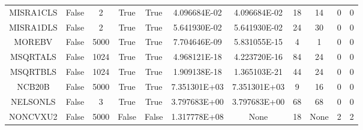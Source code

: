 \begin{longtable}{ccccccccccc}
	\cellcolor{default2} MISRA1CLS& \cellcolor{default2} False& \cellcolor{default2} 2& \cellcolor{default2} True& \cellcolor{default2} True& \cellcolor{best} 4.096684E-02& \cellcolor{ok} 4.096684E-02& \cellcolor{ok} 18& \cellcolor{best} 14& \cellcolor{default2} 0& \cellcolor{default2} 0\\
	\cellcolor{default1} MISRA1DLS& \cellcolor{default1} False& \cellcolor{default1} 2& \cellcolor{default1} True& \cellcolor{default1} True& \cellcolor{best} 5.641930E-02& \cellcolor{ok} 5.641930E-02& \cellcolor{best} 24& \cellcolor{ok} 30& \cellcolor{default1} 0& \cellcolor{default1} 0\\
	\cellcolor{default2} MOREBV& \cellcolor{default2} False& \cellcolor{default2} 5000& \cellcolor{default2} True& \cellcolor{default2} True& \cellcolor{ok} 7.704646E-09& \cellcolor{best} 5.831055E-15& \cellcolor{poor} 4& \cellcolor{best} 1& \cellcolor{default2} 0& \cellcolor{default2} 0\\
	\cellcolor{default1} MSQRTALS& \cellcolor{default1} False& \cellcolor{default1} 1024& \cellcolor{default1} True& \cellcolor{default1} True& \cellcolor{best} 4.968121E-18& \cellcolor{ok} 4.223720E-16& \cellcolor{poor} 84& \cellcolor{best} 24& \cellcolor{default1} 0& \cellcolor{default1} 0\\
	\cellcolor{default2} MSQRTBLS& \cellcolor{default2} False& \cellcolor{default2} 1024& \cellcolor{default2} True& \cellcolor{default2} True& \cellcolor{ok} 1.909138E-18& \cellcolor{best} 1.365103E-21& \cellcolor{ok} 44& \cellcolor{best} 24& \cellcolor{default2} 0& \cellcolor{default2} 0\\
	\cellcolor{default1} NCB20B& \cellcolor{default1} False& \cellcolor{default1} 5000& \cellcolor{default1} True& \cellcolor{default1} True& \cellcolor{best} 7.351301E+03& \cellcolor{ok} 7.351301E+03& \cellcolor{best} 9& \cellcolor{ok} 16& \cellcolor{default1} 0& \cellcolor{default1} 0\\
	\cellcolor{default2} NELSONLS& \cellcolor{default2} False& \cellcolor{default2} 3& \cellcolor{default2} True& \cellcolor{default2} True& \cellcolor{ok} 3.797683E+00& \cellcolor{best} 3.797683E+00& \cellcolor{best} 68& \cellcolor{best} 68& \cellcolor{default2} 0& \cellcolor{default2} 0\\
	\cellcolor{default1} NONCVXU2& \cellcolor{default1} False& \cellcolor{default1} 5000& \cellcolor{default1} False& \cellcolor{default1} False& \cellcolor{best} 1.317778E+08& \cellcolor{err} None& \cellcolor{best} 18& \cellcolor{err} None& \cellcolor{default1} 2& \cellcolor{default1} 2\\

\end{longtable}
